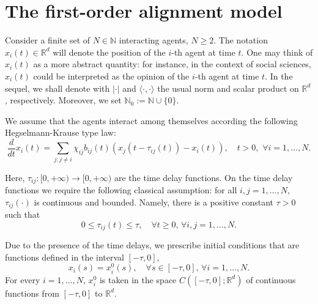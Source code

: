 \documentclass[11pt]{article}
\begin{document}
	\section{The first-order alignment model}\label{timedelay}
	\setcounter{equation}{0}
	Consider a finite set of $N\in \mathbb{N}$ interacting agents, $N\geq 2 $. The notation $x_{i}(t)\in \mathbb{R}^d$ will denote the position of the $i$-th agent at time $t$. One may think of $x_{i}(t)$ as a more abstract quantity: for instance, in the context of social sciences, $x_{i}(t)$ could be interpreted as the opinion of the $i$-th agent at time $t$. In the sequel, we shall denote with $\lvert\cdot \rvert$ and $\langle\cdot,\cdot\rangle$ the usual norm and scalar product on $\mathbb{R}^{d}$, respectively. Moreover, we set $\mathbb{N}_0:=\mathbb{N}\cup\{0\}.$ 
	
	\vspace{0.1cm}
	
	We assume that the agents interact among themselves according the following Hegselmann-Krause type law:
	\begin{equation}\label{onoff}
		\frac{d}{dt}x_{i}(t)=\underset{j:j\neq i}{\sum}\chi_{ij} b_{ij}(t)(x_{j}(t-\tau_{ij}(t))-x_{i}(t)),\quad t>0,	\,\, \forall i=1,\dots,N.
	\end{equation}
	
	Here, $\tau_{ij}:[0,+\infty)\rightarrow[0,+\infty)$ are the time delay functions. On the time delay functions we require the following classical assumption: for all $i,j=1,\dots,N$, $\tau_{ij}(\cdot)$ is continuous and bounded. Namely, there is a positive constant $\tau>0$ such that
	\begin{equation}\label{taubounded}
		0\leq \tau_{ij}(t)\leq \tau,\quad \forall t\geq 0,\,\forall i,j=1,\dots,N.
	\end{equation}
	 
    Due to the presence of the time delays, we prescribe initial conditions that are functions defined in the interval $[-\tau, 0]$, 
    \begin{equation}\label{incond}
    	x_{i}(s)=x^{0}_{i}(s),\quad \forall s\in [-\tau,0],\,\forall i=1,\dots,N.
    \end{equation}
    For every $i=1,\dots,N$, $x_i^0$ is taken in the space $C([-\tau,0];\mathbb{R}^d)$ of continuous functions from $[-\tau,0]$ to $\mathbb{R}^d$. 	
    
    \vspace{0.1cm}
    
\end{document}
